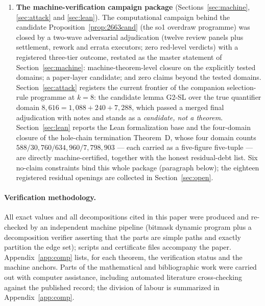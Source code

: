 \begin{enumerate}[label=(\roman*),leftmargin=2em]
eight premise conjuncts judgeable from the paper's own statements; the three bridge conjuncts
carried at registered pointer level, their definitions living in the campaign archive ---
Section~\ref{sec:conditional}).
\item \textbf{The machine-verification campaign package} (Sections~\ref{sec:machine},
\ref{sec:attack} and \ref{sec:lean}). The computational campaign behind the candidate
Proposition~\ref{prop:2663cand} (the so1 overdraw programme) was closed by a two-wave
adversarial adjudication (twelve review panels plus settlement, rework and errata executors;
zero red-level verdicts) with a registered three-tier outcome, restated as the master statement
of Section~\ref{sec:machine}: machine-theorem-level closure on the explicitly tested domains; a
paper-layer candidate; and zero claims beyond the tested domains. Section~\ref{sec:attack}
registers the current frontier of the companion selection-rule programme at $k=8$: the
candidate lemma G2-SL over the true quantifier domain $8{,}616=1{,}088+240+7{,}288$, which
passed a merged final adjudication with notes and stands as a \emph{candidate, not a theorem}.
Section~\ref{sec:lean} reports the Lean formalization base and the four-domain closure of the
hole-chain termination Theorem~D, whose four domain counts
$588/30{,}760/634{,}960/7{,}798{,}903$ --- each carried as a five-figure five-tuple --- are
directly machine-certified, together with the honest
residual-debt list. Six no-claim constraints bind this whole package (paragraph below);
the eighteen registered residual openings are collected in Section~\ref{sec:open}.
\end{enumerate}

\paragraph{Verification methodology.}
All exact values and all decompositions cited in this paper were produced and re-checked by an
independent machine pipeline (bitmask dynamic program plus a decomposition verifier asserting
that the parts are simple paths and exactly partition the edge set); scripts and certificate
files accompany the paper. Appendix~\ref{app:comp} lists, for each theorem, the verification
status and the machine anchors. Parts of the mathematical and bibliographic work were carried
out with computer assistance, including automated literature cross-checking against the
published record; the division of labour is summarized in Appendix~\ref{app:comp}.

